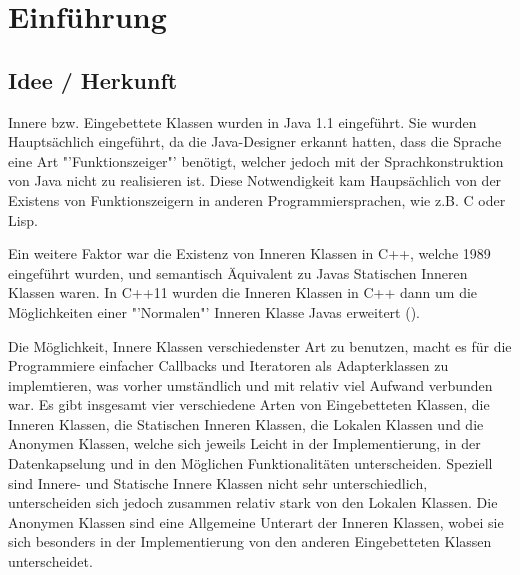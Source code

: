 \chapter{Einführung}
\section{Idee / Herkunft}

Innere bzw. Eingebettete Klassen wurden in Java 1.1 eingeführt. \cite{Oracle:JDK_Doku1.1.4}
Sie wurden Hauptsächlich eingeführt, da die Java-Designer erkannt hatten, dass die Sprache eine Art "'Funktionszeiger"' benötigt, welcher jedoch mit der Sprachkonstruktion von Java nicht zu realisieren ist.
Diese Notwendigkeit kam Haupsächlich von der Existens von Funktionszeigern in anderen Programmiersprachen, wie z.B. C oder Lisp.

Ein weitere Faktor war die Existenz von Inneren Klassen in C++, welche 1989 eingeführt wurden, und semantisch Äquivalent zu Javas Statischen Inneren Klassen waren.
In C++11 wurden die Inneren Klassen in C++ dann um die Möglichkeiten einer "'Normalen"' Inneren Klasse Javas erweitert (\cite{Ellis2007}).

Die Möglichkeit, Innere Klassen verschiedenster Art zu benutzen, macht es für die Programmiere einfacher Callbacks und Iteratoren als Adapterklassen zu implemtieren, was vorher umständlich und mit relativ viel Aufwand verbunden war.
Es gibt insgesamt vier verschiedene Arten von Eingebetteten Klassen, die Inneren Klassen, die Statischen Inneren Klassen, die Lokalen Klassen und die Anonymen Klassen, welche sich jeweils Leicht in der Implementierung, in der Datenkapselung und in den Möglichen Funktionalitäten unterscheiden.
Speziell sind Innere- und Statische Innere Klassen nicht sehr unterschiedlich, unterscheiden sich jedoch zusammen relativ stark von den Lokalen Klassen.
Die Anonymen Klassen sind eine Allgemeine Unterart der Inneren Klassen, wobei sie sich besonders in der Implementierung von den anderen Eingebetteten Klassen unterscheidet.

\newpage
